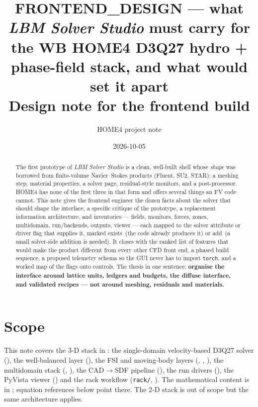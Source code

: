 \documentclass[11pt,a4paper]{article}
\title{\textbf{FRONTEND\_DESIGN} --- what \emph{LBM Solver Studio} must carry for the
WB HOME4 D3Q27 hydro + phase-field stack, and what would set it apart\\[2pt]
\large Design note for the frontend build}
\author{HOME4 project note}
\date{2026-10-05}
\newcommand{\code}[1]{\texttt{#1}}
\newcommand{\have}{\textcolor{green!45!black}{exists}}
\newcommand{\addme}{\textcolor{orange!80!black}{add}}
\begin{document}
\maketitle

\begin{abstract}
\noindent The first prototype of \emph{LBM Solver Studio} is a clean, well-built shell
whose \emph{shape} was borrowed from finite-volume Navier--Stokes products (Fluent,
SU2, STAR): a meshing step, material properties, a solver page, residual-style
monitors, and a post-processor. HOME4 has none of the first three in that form and
offers several things an FV code cannot. This note gives the frontend engineer the
dozen facts about the solver that should shape the interface, a specific critique of
the prototype, a replacement information architecture, and inventories --- fields,
monitors, forces, zones, multidomain, run/backends, outputs, viewer --- each mapped to
the solver attribute or driver flag that supplies it, marked \have\ (the code
already produces it) or \addme\ (a small solver-side addition is needed). It closes
with the ranked list of features that would make the product different from every
other CFD front end, a phased build sequence, a proposed telemetry schema so the GUI
never has to import \code{torch}, and a worked map of the 
flags onto controls. The thesis in one sentence: \textbf{organise the interface
around lattice units, ledgers and budgets, the diffuse interface, and validated
recipes --- not around meshing, residuals and materials.}
\end{abstract}

\tableofcontents

\section{Scope}
This note covers the 3-D stack in : the single-domain
velocity-based D3Q27 solver (), the well-balanced
layer (), the FSI and moving-body layers
(, ,
), the multidomain stack (,
), the CAD$\to$SDF pipeline (), the
run drivers (), the PyVista viewer () and the
rack workflow (\code{rack/}, ). The mathematical content is
in ; equation references below point there.
The 2-D stack is out of scope but the same architecture applies.
\end{document}
